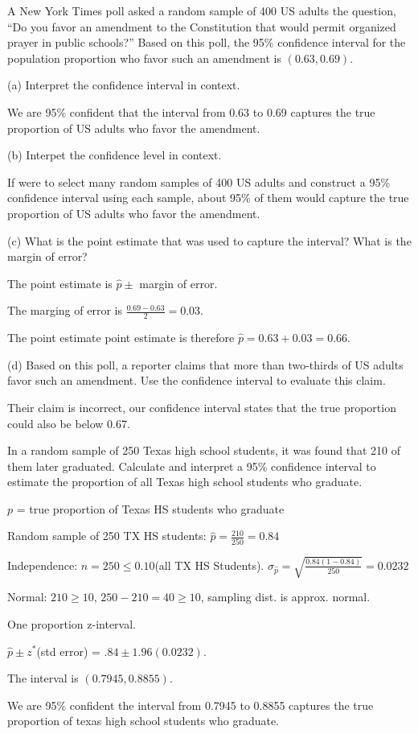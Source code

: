 \documentclass[../stats.tex]{subfiles}
\begin{document}
\begin{example}
    A New York Times poll asked a random sample of 400 US adults the question, ``Do you favor an amendment to the Constitution that would permit organized prayer in public schools?'' Based on this poll, the 95\% confidence interval for the population proportion who favor such an amendment is $(0.63,0.69)$.

    (a) Interpret the confidence interval in context.

    We are 95\% confident that the interval from 0.63 to 0.69 captures the true proportion of US adults who favor the amendment.

    (b) Interpet the confidence level in context.

    If were to select many random samples of 400 US adults and construct a 95\% confidence interval using each sample, about 95\% of them would capture the true proportion of US adults who favor the amendment.

    (c) What is the point estimate that was used to capture the interval? What is the margin of error?

    The point estimate is $\hat{p} \pm$ margin of error.

    The marging of error is $\frac{0.69-0.63}{2}=0.03$.

    The point estimate point estimate is therefore $\hat{p}=0.63+0.03=0.66$.

    (d) Based on this poll, a reporter claims that more than two-thirds of US adults favor such an amendment. Use the confidence interval to evaluate this claim.

    Their claim is incorrect, our confidence interval states that the true proportion could also be below 0.67.
\end{example}

\begin{example}
    In a random sample of 250 Texas high school students, it was found that 210 of them later graduated. Calculate and interpret a 95\% confidence interval to estimate the proportion of all Texas high school students who graduate.

    $p$ = true proportion of Texas HS students who graduate 

    Random sample of 250 TX HS students: $\hat{p}=\frac{210}{250}=0.84$

    Independence: $n=250\leq 0.10$(all TX HS Students). $\sigma_{\hat{p}}=\sqrt{\frac{0.84(1-0.84)}{250}}=0.0232$

    Normal: $210\geq 10$, $250-210=40\geq 10$, sampling dist. is approx. normal.

    One proportion z-interval.

    $\hat{p}\pm z^*$(std error) = $.84\pm 1.96(0.0232)$. 

    The interval is $(0.7945, 0.8855)$. 

    We are 95\% confident the interval from 0.7945 to 0.8855 captures the true proportion of texas high school students who graduate.
\end{example}
\end{document}
